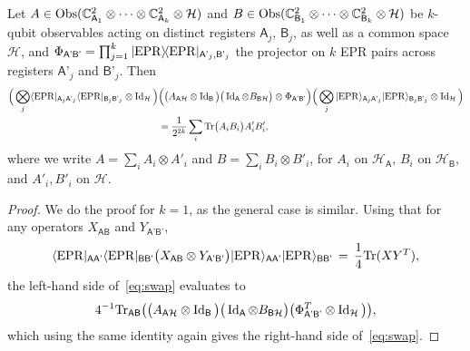 \documentclass{toc}
\newcommand{\ket}[1]{|#1\rangle}
\newcommand{\bra}[1]{\langle#1|}
\newcommand{\proj}[1]{\ket{#1}\!\bra{#1}}
\newcommand{\Tr}{\mbox{\rm Tr}}
\newcommand{\Id}{\ensuremath{\mathop{\rm Id}\nolimits}}
\newcommand{\setft}[1]{\mathrm{#1}}
\newcommand{\Obs}{\setft{Obs}}
\newcommand{\reg}[1]{{\textsf{#1}}}
\newcommand{\mH}{\mathcal{H}}
\newcommand{\EPR}{{\rm EPR}}
\begin{document}
\begin{claim}\label{claim:swap-tt}
Let $A\in \Obs(\C^2_{\reg{A}_1}\otimes \cdots\otimes \C^2_{\reg{A}_k} \otimes \mH)$ and $B\in \Obs(\C^2_{\reg{B}_1}\otimes \cdots\otimes \C^2_{\reg{B}_k}\otimes \mH)$ be $k$-qubit observables acting on distinct registers $\reg{A}_j$, $\reg{B}_j$, as well as a common space $\mH$, and $\Phi_{\reg{A'B'}} = \prod_{j=1}^k \proj{\EPR}_{\reg{A'}_j,\reg{B'}_j}$ the projector on $k$ EPR pairs across registers $\reg{A'}_j$ and $\reg{B'}_j$.  Then 
\begin{align}
 \Big(\bigotimes_j \bra{\EPR}_{\reg{A}_j\reg{A'}_j}\bra{\EPR}_{\reg{B}_j\reg{B'}_j} \otimes \Id_{\mH} \Big)&\Big(\big(A_{\reg{A}\mH} \otimes \Id_\reg{B}\big)\big( \Id_\reg{A}\otimes B _{\reg{B}\mH}\big)\otimes \Phi_{\reg{A'B'}}\Big) \Big(\bigotimes_j \ket{\EPR}_{\reg{A}_j\reg{A'}_j}\ket{\EPR}_{\reg{B}_j\reg{B'}_j} \otimes \Id_\mH\Big)\notag\\
& = \frac{1}{2^{2k}}\sum_i \Tr\big(A_i B_i\big) A'_iB'_i,\label{eq:swap}
\end{align}
where we write $A = \sum_i A_i \otimes A'_i$ and $B=\sum_i B_i\otimes B'_i$, for $A_i$ on $\mH_\reg{A}$, $B_i$ on $\mH_{\reg{B}}$, and $A'_i,B'_i$ on $\mH$.
\end{claim}


\begin{proof}
We do the proof for $k=1$, as the general case is similar. Using that for any operators $X_{\reg{AB}} $ and $ Y_{\reg{A'B'}}$, 
$$\bra{\EPR}_{\reg{AA'}}\bra{\EPR}_{\reg{BB'}} \big( X_{\reg{AB}} \otimes Y_{\reg{A'B'}} \big) \ket{\EPR}_{\reg{AA'}}\ket{\EPR}_{\reg{BB'}} \,=\, \frac{1}{4}\Tr(XY^T),$$
the left-hand side of~\eqref{eq:swap} evaluates to 
$$4^{-1} \Tr_{\reg{AB}}\big( \big(A_{\reg{A}\mH} \otimes \Id_\reg{B}\big)\big( \Id_\reg{A}\otimes B _{\reg{B}\mH}\big)\big(\Phi_{\reg{A'B'}}^T\otimes \Id_\mH\big)\big),$$
 which using the same identity again 
gives the right-hand side of~\eqref{eq:swap}.
\end{proof}

 
 

   

% 
% 

\end{document}
